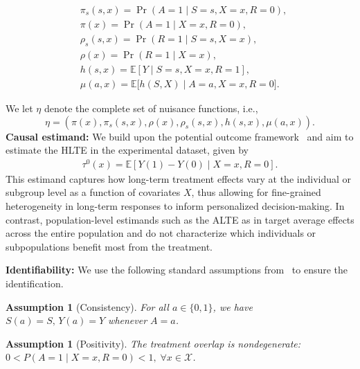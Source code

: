 \documentclass{article}
\theoremstyle{plain}
\theoremstyle{definition}
\newtheorem{assumption}[theorem]{Assumption}
\theoremstyle{remark}
\newcommand{\E}{\mathbb{E}}                %
\newcommand{\1}{\mathds{1}}                %
\newcommand{\TODO}[1]{\textcolor{lightred}{#1}}
\begin{document}
\vspace{-0.5cm}
\footnotesize
\begin{align}
    &\pi_s(s,x)=\Pr(A=1\mid S = s,X = x,R = 0),\label{pi-sx-def}\\
    &\pi(x)=\Pr(A=1\mid X = x,R = 0),\label{pi-x-def}\\
    &\rho_s(s,x)=\Pr(R=1\mid S = s,X = x), \label{rho-sx-def}\\
    &\rho(x)=\Pr(R=1\mid X = x), \label{rho-x-def}\\
    &h(s,x)=\mathbb E[Y\mid S = s,X = x,R = 1], \label{h-def}\\
    &\mu(a,x)=\mathbb E \big[h(S,X)\mid A = a,X = x,R = 0\big] \label{mu-def}.
\end{align}
\vspace{-0.5cm}
\normalsize

We let $\eta$ denote the complete set of nuisance functions, i.e.,
\begin{equation}
\label{eq:def-eta}
    \eta = (\pi(x), \pi_s(s,x), \rho(x),\rho_s(s,x),h(s,x), \mu(a,x)).
\end{equation}
\textbf{Causal estimand:} We build upon the potential outcome framework~\cite{Rubin.1972} and aim to estimate the HLTE in the experimental dataset, given by
\begin{align}
\label{tau0-def}
    \tau^0(x)=\E\left[Y(1)-Y(0) \mid X=x,R=0\right].
\end{align}
This estimand captures how long-term treatment effects vary at the individual or subgroup level as a function of covariates $X$, thus allowing for fine-grained heterogeneity in long-term responses to inform personalized decision-making. In contrast, population-level estimands such as the ALTE as in \citet{Athey.2025} target average effects across the entire population and do not characterize which individuals or subpopulations benefit most from the treatment.


\textbf{Identifiability: } We use the following standard assumptions from~\citet{Athey.2025} to ensure the identification. %
\begin{assumption}[Consistency]
\label{assumption-consistency} \emph{For all $a \in \{0,1\}$, we have $S(a)=S, \,Y(a)=Y$ whenever $A=a$.}
\end{assumption}
\begin{assumption}[Positivity] 
\label{assumption-positivity} \textit{The treatment overlap is nondegenerate: $0< P(A=1 \mid X=x, R=0)<1, \; \forall x\in \mathcal{X}$.}
\end{assumption}
\end{document}
